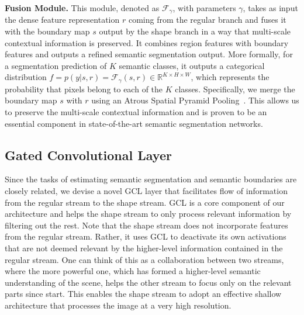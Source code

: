 \documentclass[10pt,twocolumn,letterpaper]{article}
\begin{document}
\vspace{1mm}
\noindent \textbf{Fusion Module.} This module, denoted as $\mathcal{F}_\gamma$, with parameters $\gamma$, takes as input the dense feature representation $r$ coming from the regular branch and fuses it with the boundary map $s$ output by the shape branch in a way that multi-scale contextual information is preserved. It combines region features with boundary features and outputs a refined semantic segmentation output. More formally, for a segmentation prediction of $K$ semantic classes, it outputs a categorical distribution $f = p(y|s,r)=\mathcal{F}_{{\gamma}}(s,r) \in \mathbb{R}^{K \times H \times W}$, which represents the probability that pixels belong to each of the $K$ classes.
Specifically, we  merge the boundary map $s$ with $r$ using an Atrous Spatial Pyramid Pooling~\cite{deeplabv3plus2018}. 
This allows us to preserve the multi-scale contextual information and is proven to be an essential component in state-of-the-art semantic segmentation networks.

\vspace{-2mm}
\subsection{Gated Convolutional Layer}
Since the tasks of estimating semantic segmentation and semantic boundaries are closely related, we devise a novel GCL layer that facilitates flow of information from the regular stream to the shape stream.
GCL is a core component of our architecture and helps the shape stream to only process relevant information by filtering out the rest. 
Note that the shape stream does not incorporate features from the regular stream. Rather, it uses GCL to deactivate its own activations that are not deemed relevant by the higher-level information contained in the regular stream. One can think of this as a collaboration between two streams, where the more powerful one, which has formed a higher-level semantic understanding of the scene, helps the other stream to focus only on the relevant parts since start. This enables the shape stream to adopt an effective shallow architecture that processes the image at a very high resolution.
\end{document}
